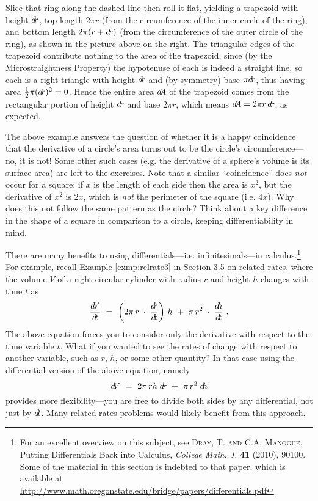 \begin{exmp}
Slice that ring along the dashed line then roll it flat, yielding a trapezoid
with height $d\!r$, top length $2\pi r$ (from the circumference of the inner
circle of the ring), and bottom length $2\pi(r+d\!r)$ (from the circumference of
the outer circle of the ring), as shown in the picture above on the right. The
triangular edges of the trapezoid contribute nothing to the area of the
trapezoid, since (by the Microstraightness Property) the hypotenuse of each is
indeed a straight line, so each is a right triangle with height $d\!r$ and (by
symmetry) base $\pi d\!r$, thus having area $\frac{1}{2}\pi(d\!r)^2 = 0$. Hence the
entire area $d\negmedspace A$ of the trapezoid comes from the rectangular
portion of height $d\!r$ and base $2\pi r$, which means
$d\negmedspace A = 2\pi r\,d\!r$, as expected.
\end{exmp}
\divider
\vspace{3mm}

The above example answers the question of whether it is a happy coincidence that
the derivative of a circle's area turns out to be the circle's
circumference---no, it is not! Some other such cases (e.g. the derivative of a
sphere's volume is its surface area) are left to the exercises. Note that a
similar ``coincidence'' does \emph{not} occur for a square: if $x$ is the length
of each side then the area is $x^2$, but the derivative of $x^2 $ is $2x$, which
is \emph{not} the perimeter of the square (i.e. $4x$). Why does this not follow
the same pattern as the circle? Think about a key difference in the shape of a
square in comparison to a circle, keeping differentiability in mind.

There are many benefits to using differentials---i.e. infinitesimals---in
calculus.\footnote{For an excellent overview on this subject, see \textsc{Dray,
T. and C.A. Manogue}, Putting Differentials Back into Calculus,
\emph{College Math. J.} \textbf{41} (2010), 90100. Some of the
material in this section is indebted to that paper, which is available at
\url{http://www.math.oregonstate.edu/bridge/papers/differentials.pdf}} For
example, recall Example \ref{exmp:relrate3} in Section 3.5 on related rates,
where the volume $V$ of a right circular cylinder with radius $r$ and height
$h$ changes with time $t$ as
\[
\frac{d\negmedspace V}{d\!t} ~=~ \left( 2\pi \,r\;\cdot\;\frac{d\negmedspace r}{d\!t}\right)\,h ~+~
 \pi\,r^2 \;\cdot\;\frac{d\negmedspace h}{d\!t} ~.
\]
The above equation forces you to consider only the derivative with respect
to the time variable $t$. What if you wanted to see the rates of change with
respect to another variable, such as $r$, $h$, or some other quantity?
In that case using the differential version of the above equation, namely
\[
d\negmedspace V ~=~ 2\pi \,rh\;d\!r ~+~ \pi\,r^2 \;d\negmedspace h
\]
provides more flexibility---you are free to divide both sides by any
differential, not just by $d\!t$. Many related rates problems would likely
benefit from this approach.

